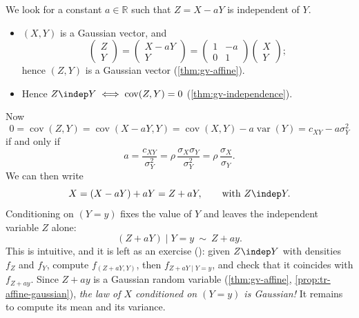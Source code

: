 We look for a constant $a\in\mathbb R$ such that $Z=X-aY$ is independent of $Y$.
\begin{itemize}
  \item $(X,Y)$ is a Gaussian vector, and
    \[
      \begin{pmatrix}Z\\Y\end{pmatrix}=\begin{pmatrix}X-aY\\Y\end{pmatrix}
      =\begin{pmatrix}1&-a\\0&1\end{pmatrix}\begin{pmatrix}X\\Y\end{pmatrix};
    \]
    hence $(Z,Y)$ is a Gaussian vector (\cref{thm:gv-affine}).
  \item Hence $Z\indep Y\iff\operatorname{cov}(Z,Y)=0$ (\cref{thm:gv-independence}).
\end{itemize}
Now
\[
  0=\operatorname{cov}(Z,Y)=\operatorname{cov}(X-aY,Y)=\operatorname{cov}(X,Y)-a\operatorname{var}(Y)
  =c_{XY}-a\sigma_Y^2
\]
if and only if
\begin{equation}\label{eq:gc-a}
  a=\frac{c_{XY}}{\sigma_Y^2}=\rho\,\frac{\sigma_X\sigma_Y}{\sigma_Y^2}=\rho\,\frac{\sigma_X}{\sigma_Y}.
\end{equation}
We can then write
\[
  X=(X-aY)+aY=Z+aY,\qquad\text{with }Z\indep Y .
\]
Conditioning on $(Y=y)$ fixes the value of $Y$ and leaves the independent variable $Z$ alone:
\[
  (Z+aY)\mid Y=y\ \sim\ Z+ay .
\]
This is intuitive, and it is left as an exercise (): given $Z\indep Y$ with
densities $f_Z$ and $f_Y$, compute $f_{(Z+aY,Y)}$, then $f_{Z+aY\mid Y=y}$, and check that it
coincides with $f_{Z+ay}$. Since $Z+ay$ is a Gaussian random variable (\cref{thm:gv-affine},
\cref{prop:tr-affine-gaussian}), \emph{the law of $X$ conditioned on $(Y=y)$ is Gaussian!} It remains
to compute its mean and its variance.

